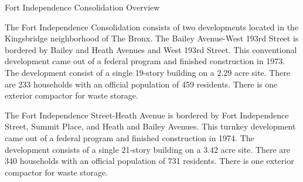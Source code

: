 Fort Independence Consolidation Overview

The Fort Independence Consolidation consists of two developments located in the Kingsbridge neighborhood of The Bronx. The Bailey Avenue-West 193rd Street is bordered by Bailey and Heath Avenues and West 193rd Street. This conventional development came out of a federal program and finished construction in 1973. The development consist of a single 19-story building on a 2.29 acre site. There are 233 households with an official population of 459 residents. There is one exterior compactor for waste storage.

The Fort Independence Street-Heath Avenue is bordered by Fort Independence Street, Summit Place, and Heath and Bailey Avenues. This turnkey development came out of a federal program and finished construction in 1974. The development consists of a single 21-story building on a 3.42 acre site. There are 340 households with an official population of 731 residents. There is one exterior compactor for waste storage.